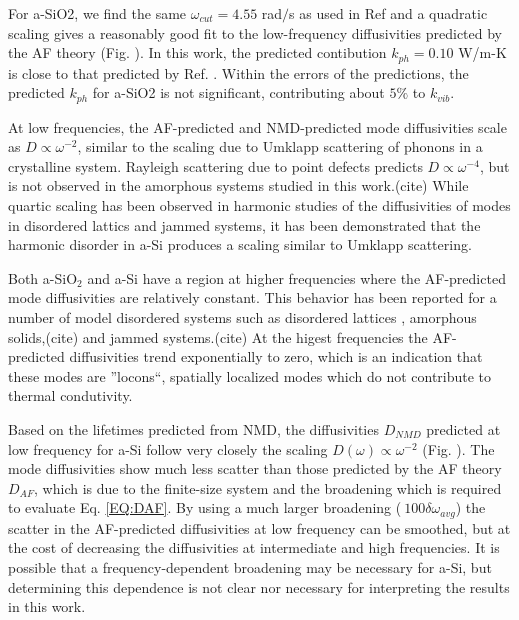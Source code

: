 \documentclass[aps,prb,twocolumn,superscriptaddress,footinbib,amsmath,amssymb,floatfix]{revtex4}
\begin{document}
For a-SiO2, we find the same $\omega_{cut} = 4.55$ rad$/$s as used in 
Ref  and a quadratic scaling gives a reasonably 
good fit 
to the low-frequency diffusivities predicted by the AF theory (Fig. ). 
In this work, the predicted contibution $k_{ph} =0.10$ W/m-K is 
close to that predicted by Ref. . Within 
the errors of the predictions, the predicted $k_{ph}$ for a-SiO2 
is not significant, contributing about $5\%$ to $k_{vib}$. 

At low frequencies, the AF-predicted and NMD-predicted mode 
diffusivities scale as $D \propto \omega^{-2}$, similar to the scaling 
due to Umklapp scattering of phonons in a crystalline system. Rayleigh 
scattering due to point defects predicts $D \propto \omega^{-4}$, 
but is not observed in the amorphous systems studied in this work.(cite) 
While quartic scaling has been 
observed in harmonic studies of the diffusivities of modes in 
disordered lattics and jammed systems,
\cite{sheng_heat_1991,xu_energy_2009,vitelli_heat_2010} 
it has been demonstrated that the harmonic disorder in a-Si 
produces a scaling similar to Umklapp scattering.
\cite{feldman_thermal_1993}

Both a-SiO$_2$ and a-Si have a region at higher frequencies where the 
AF-predicted mode diffusivities are relatively constant. This behavior 
has been reported for a number of model disordered systems such as 
disordered lattices
\cite{sheng_heat_1991,beltukov_ioffe-regel_2013,larkin_predicting_2013}, 
amorphous solids,(cite) and jammed systems.(cite) At the higest 
frequencies the AF-predicted 
diffusivities trend exponentially to zero, which is an indication 
that these modes are ''locons``, spatially localized modes which 
do not contribute to thermal condutivity.
\cite{allen_diffusons_1999,garber_numerical_2001} 

Based on the lifetimes predicted from NMD, the diffusivities 
$D_{NMD}$ predicted 
at low frequency for a-Si follow very closely the scaling 
$D(\omega) \propto \omega^{-2}$ (Fig. ). The mode diffusivities show much 
less 
scatter than those predicted by the AF theory $D_{AF}$, which is due to 
the finite-size system and the broadening which is required to evaluate 
Eq. \eqref{EQ:DAF}.\cite{feldman_thermal_1993} By using a much larger 
broadening ($~100\delta\omega_{avg}$) the scatter in the AF-predicted 
diffusivities at low frequency can be smoothed, but at the cost of 
decreasing the diffusivities at intermediate and high frequencies. 
It is possible that a frequency-dependent broadening may be necessary 
for a-Si, 
but determining this dependence is not clear nor necessary for 
interpreting the results in this work. 
\end{document}
